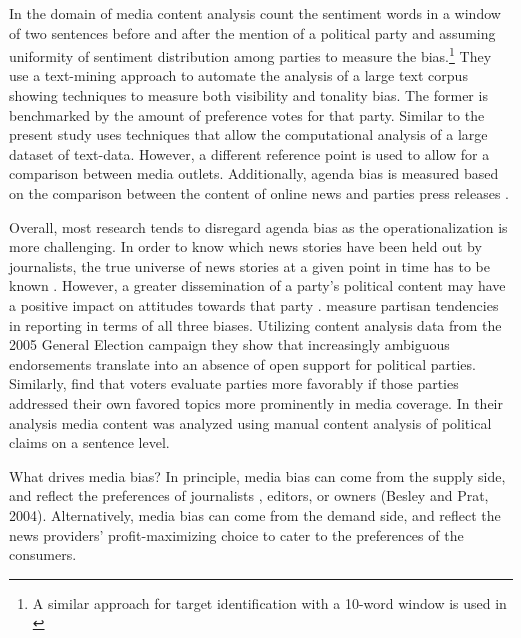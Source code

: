 \documentclass[12pt,a4paper,notitlepage]{article}
\begin{document}
In the domain of media content analysis \citet{junque_de_fortuny_media_2012} count the sentiment words in a window of two sentences before and after the mention of a political party and assuming uniformity of sentiment distribution among parties to measure the bias.\footnote{A similar approach for target identification with a 10-word window is used in \citet{balahur_sentiment_2013}} They use a text-mining approach to automate the analysis of a large text corpus showing techniques to measure both visibility and tonality bias. The former is benchmarked by the amount of preference votes for that party. Similar to \citet{junque_de_fortuny_media_2012} the present study uses techniques that allow the computational analysis of a large dataset of text-data. However, a different reference point is used to allow for a comparison between media outlets. Additionally, agenda bias is measured based on the comparison between the content of online news and parties press releases \citet{eberl_one_2017}.  

Overall, most research tends to disregard agenda bias as the operationalization is more challenging. In order to know which news stories have been held out by journalists, the true universe of news stories at a given point in time has to be known \citet{dalessio_media_2000}. However, a greater dissemination of a party's political content may have a positive impact on attitudes towards that party \citep{benewick_floating_1969, eberl_one_2017}. \citet{brandenburg_party_2006} measure partisan tendencies in reporting in terms of all three biases. Utilizing content analysis data from the 2005 General Election campaign they show that increasingly ambiguous endorsements translate into an absence of open support for political parties. Similarly, \citet{eberl_one_2017} find that voters evaluate parties more favorably if those parties addressed their own favored topics more prominently in media coverage. In their analysis media content was analyzed using manual content analysis of political claims on a sentence level.

What drives media bias?
In principle, media bias can come from the supply side, and reflect the preferences of journalists \citep{baron_persistent_2006}, editors, or owners (Besley and Prat, 2004). Alternatively, media bias can come from the demand side, and reflect the news providers' profit-maximizing choice to cater to the preferences of the consumers.
\end{document}
